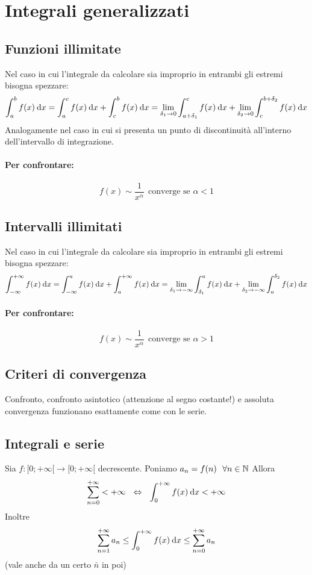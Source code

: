 \documentclass{article}
\begin{document}
\section*{Integrali generalizzati}
\subsection*{Funzioni illimitate}
\begin{oss}
    Nel caso in cui l'integrale da calcolare sia improprio in entrambi gli estremi bisogna spezzare:
    \[\int_a^bf(x)\:\text{d} x=\int_a^cf(x)\:\text{d} x+\int_c^bf(x)\:\text{d} x=\lim_{\delta_1\to 0}\int_{a+\delta_1}^cf(x)\:\text{d} x+\lim_{\delta_2\to 0}\int_c^{b+\delta_2}f(x)\:\text{d} x\]
    Analogamente nel caso in cui si presenta un punto di discontinuità all'interno dell'intervallo di integrazione.
\end{oss}
\paragraph*{Per confrontare:}
\[f(x)\sim \frac{1}{x^\alpha}~~\text{converge se } \alpha <1\]
\subsection*{Intervalli illimitati}
\begin{oss}
    Nel caso in cui l'integrale da calcolare sia improprio in entrambi gli estremi bisogna spezzare:
    \[\int_{-\infty}^{+\infty}f(x)\:\text{d} x=\int_{-\infty}^af(x)\:\text{d} x+\int_a^{+\infty}f(x)\:\text{d} x=\lim_{\delta_1\to -\infty}\int_{\delta_1}^af(x)\:\text{d} x+\lim_{\delta_2\to -\infty}\int_a^{\delta_2}f(x)\:\text{d} x\]
\end{oss}
\paragraph*{Per confrontare:}
\[f(x)\sim \frac{1}{x^\alpha}~~\text{converge se } \alpha >1\]

\subsection*{Criteri di convergenza}
Confronto, confronto asintotico (attenzione al segno costante!) e assoluta convergenza funzionano esattamente come con le serie. 
\subsection*{Integrali e serie}
\begin{shadedTheorem}
    Sia $f:[0;+\infty[\to [0;+\infty[$ decrescente. Poniamo $a_n=f(n)~~\forall n \in \mathbb{N}$
    Allora
    \[\sum_{n=0}^{+\infty}<+\infty~~\Leftrightarrow~~\int_0^{+\infty}f(x)\:\text{d} x<+\infty\]
    Inoltre
    \[\sum_{n=1}^{+\infty}a_n\leq \int_0^{+\infty}f(x)\:\text{d} x\leq \sum_{n=0}^{+\infty}a_n\]
    (vale anche da un certo $\bar n$ in poi)
\end{shadedTheorem}
\end{document}
